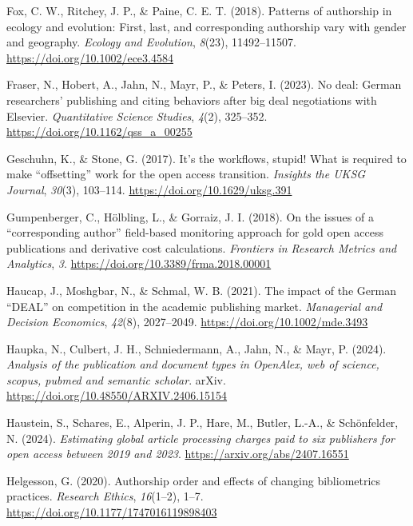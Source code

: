 \documentclass[a4paper,man,floatsintext,longtable,noextraspace,10pt]{apa6}
\newlength{\cslhangindent}
\newenvironment{CSLReferences}[2] %
{\begin{list}{}{%
  \setlength{\itemindent}{0pt}
  \setlength{\leftmargin}{0pt}
  \setlength{\parsep}{0pt}
  \ifodd #1
  \setlength{\leftmargin}{\cslhangindent}
  \setlength{\itemindent}{-1\cslhangindent}
  \fi
  \setlength{\itemsep}{#2\baselineskip}}}
{\end{list}}
\begin{document}
\begin{CSLReferences}{1}{0}
Fox, C. W., Ritchey, J. P., \& Paine, C. E. T. (2018). Patterns of
authorship in ecology and evolution: First, last, and corresponding
authorship vary with gender and geography. \emph{Ecology and Evolution},
\emph{8}(23), 11492--11507. \url{https://doi.org/10.1002/ece3.4584}

Fraser, N., Hobert, A., Jahn, N., Mayr, P., \& Peters, I. (2023). No
deal: German researchers' publishing and citing behaviors after big deal
negotiations with {Elsevier}. \emph{Quantitative Science Studies},
\emph{4}(2), 325--352. \url{https://doi.org/10.1162/qss_a_00255}

Geschuhn, K., \& Stone, G. (2017). It's the workflows, stupid! What is
required to make {``offsetting''} work for the open access transition.
\emph{Insights the {UKSG} Journal}, \emph{30}(3), 103--114.
\url{https://doi.org/10.1629/uksg.391}

Gumpenberger, C., Hölbling, L., \& Gorraiz, J. I. (2018). On the issues
of a {``corresponding author''} field-based monitoring approach for gold
open access publications and derivative cost calculations.
\emph{Frontiers in Research Metrics and Analytics}, \emph{3}.
\url{https://doi.org/10.3389/frma.2018.00001}

Haucap, J., Moshgbar, N., \& Schmal, W. B. (2021). The impact of the
{German {``DEAL''}} on competition in the academic publishing market.
\emph{Managerial and Decision Economics}, \emph{42}(8), 2027--2049.
\url{https://doi.org/10.1002/mde.3493}

Haupka, N., Culbert, J. H., Schniedermann, A., Jahn, N., \& Mayr, P.
(2024). \emph{Analysis of the publication and document types in
OpenAlex, web of science, scopus, pubmed and semantic scholar}. arXiv.
\url{https://doi.org/10.48550/ARXIV.2406.15154}

Haustein, S., Schares, E., Alperin, J. P., Hare, M., Butler, L.-A., \&
Schönfelder, N. (2024). \emph{Estimating global article processing
charges paid to six publishers for open access between 2019 and 2023}.
\url{https://arxiv.org/abs/2407.16551}

Helgesson, G. (2020). Authorship order and effects of changing
bibliometrics practices. \emph{Research Ethics}, \emph{16}(1--2), 1--7.
\url{https://doi.org/10.1177/1747016119898403}


\end{CSLReferences}
\end{document}
